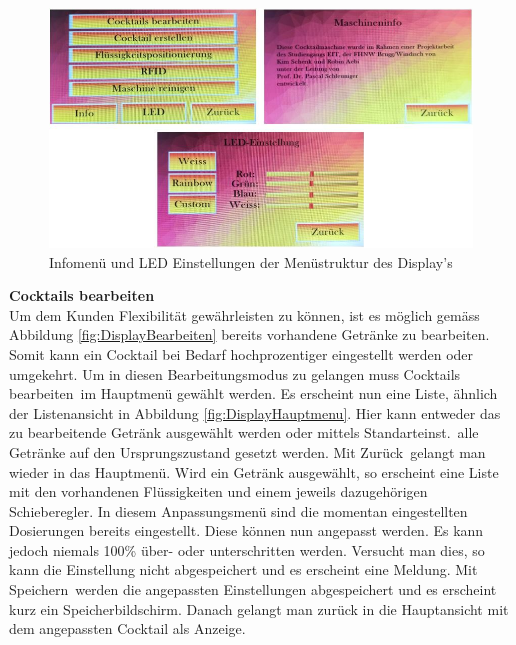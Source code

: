 \begin{figure}[H]
	\centering
	\includegraphics[width=\textwidth]{graphics/DisplayInfoLed}
	\caption{Infomenü und LED Einstellungen der Menüstruktur des Display's}
	\label{fig:DisplayInfoLed}
\end{figure}

\textbf{Cocktails bearbeiten}\\
Um dem Kunden Flexibilität gewährleisten zu können, ist es möglich gemäss Abbildung \ref{fig:DisplayBearbeiten} bereits vorhandene Getränke zu bearbeiten. Somit kann ein Cocktail bei Bedarf hochprozentiger eingestellt werden oder umgekehrt. Um in diesen Bearbeitungsmodus zu gelangen muss \flqq Cocktails bearbeiten\frqq~im Hauptmenü gewählt werden. Es erscheint nun eine Liste, ähnlich der Listenansicht in Abbildung \ref{fig:DisplayHauptmenu}. Hier kann entweder das zu bearbeitende Getränk ausgewählt werden oder mittels \flqq Standarteinst.\frqq~alle Getränke auf den Ursprungszustand gesetzt werden. Mit \flqq Zurück\frqq~gelangt man wieder in das Hauptmenü. Wird ein Getränk ausgewählt, so erscheint eine Liste mit den vorhandenen Flüssigkeiten und einem jeweils dazugehörigen Schieberegler. In diesem Anpassungsmenü sind die momentan eingestellten Dosierungen bereits eingestellt. Diese können nun angepasst werden. Es kann jedoch niemals 100\% über- oder unterschritten werden. Versucht man dies, so kann die Einstellung nicht abgespeichert und es erscheint eine Meldung. Mit \flqq Speichern\frqq~werden die angepassten Einstellungen abgespeichert und es erscheint kurz ein Speicherbildschirm. Danach gelangt man zurück in die Hauptansicht mit dem angepassten Cocktail als Anzeige.


